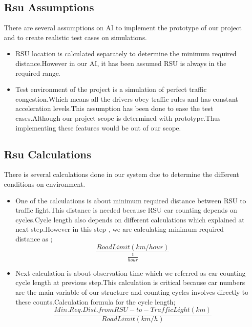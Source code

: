 \documentclass[conference]{IEEEtran}
\begin{document}
\subsection{Rsu Assumptions}
    There are several assumptions on AI to implement the prototype of our project and to create realistic test cases on simulations.
    \begin{itemize}
	      	\item RSU location is calculated separately to determine the minimum required distance.However in our AI, it has been assumed RSU is always in the required range.
	      	\\
	      	\item Test environment of the project is a simulation of perfect traffic congestion.Which means all the drivers obey traffic rules and has constant acceleration levels.This assumption has been done to ease the test cases.Although our project scope is determined with prototype.Thus implementing these features would be out of our scope. 
	\end{itemize}
\subsection{Rsu Calculations}
 There is several calculations done in our system due to determine the different conditions on environment.
    \begin{itemize}
	      	\item One of the calculations is about minimum required distance between RSU to traffic light.This distance is needed because RSU car counting depends on cycles.Cycle length also depends on different calculations which explained at next step.However in this step , we are calculating minimum required distance as ;
	      	\begin{equation}
            \frac{Road Limit (km/hour) }{\frac{1}{hour}}
            \end{equation} 
	      	\item Next calculation is about observation time which we referred as car counting cycle length at previous step.This calculation is critical because car numbers are the main variable of our structure and counting cycles involves directly to these counts.Calculation formula for the cycle length; 
	      	\begin{equation}\frac {Min. Req. Dist. from RSU-to-Traffic Light ( km )} { Road Limit ( km/h )} \end{equation} 

	\end{itemize}
\end{document}
